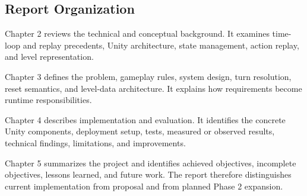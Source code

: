 \subsection{Report Organization}

Chapter 2 reviews the technical and conceptual background. It examines time-loop and replay precedents, Unity architecture, state management, action replay, and level representation.

Chapter 3 defines the problem, gameplay rules, system design, turn resolution, reset semantics, and level-data architecture. It explains how requirements become runtime responsibilities.

Chapter 4 describes implementation and evaluation. It identifies the concrete Unity components, deployment setup, tests, measured or observed results, technical findings, limitations, and improvements.

Chapter 5 summarizes the project and identifies achieved objectives, incomplete objectives, lessons learned, and future work. The report therefore distinguishes current implementation from proposal and from planned Phase 2 expansion.
